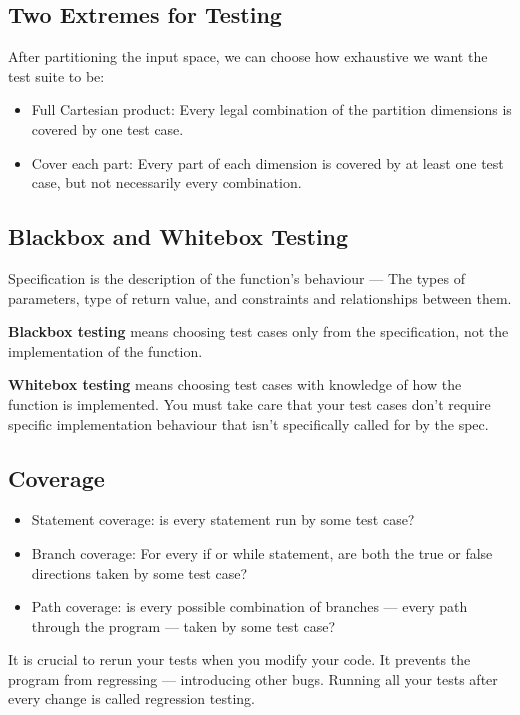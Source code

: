 \documentclass[letterpaper,12pt]{article}
\begin{document}
\subsection{Two Extremes for Testing}
After partitioning the input space, we can choose how exhaustive we want the
test suite to be:
\begin{itemize}
      \item Full Cartesian product: Every legal combination of the partition dimensions is
            covered by one test case.
      \item Cover each part: Every part of each dimension is covered by at least one test
            case, but not necessarily every combination.
\end{itemize}

\subsection{Blackbox and Whitebox Testing}

Specification is the description of the function's behaviour --- The types of
parameters, type of return value, and constraints and relationships between
them.

\textbf{Blackbox testing} means choosing test cases only from the specification, not the implementation of the function.

\textbf{Whitebox testing} means choosing test cases with knowledge of how the function is implemented.
You must take care that your test cases don't require specific implementation behaviour that isn't specifically called for by the spec.

\subsection{Coverage}

\begin{itemize}
      \item Statement coverage: is every statement run by some test case?
      \item Branch coverage: For every if or while statement, are both the true or false
            directions taken by some test case?
      \item Path coverage: is every possible combination of branches --- every path through
            the program --- taken by some test case?
\end{itemize}

It is crucial to rerun your tests when you modify your code. It prevents the program
from regressing --- introducing other bugs. Running all your tests after every
change is called regression testing.
\end{document}
